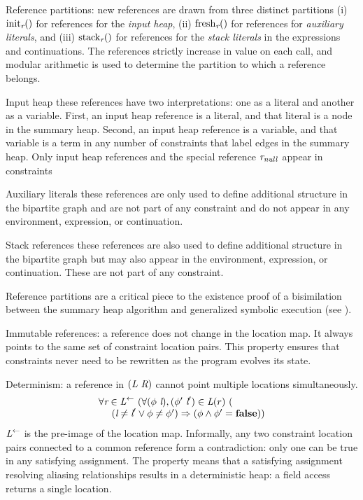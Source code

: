 Reference partitions: new references are drawn from
  three distinct partitions (i) $\mathrm{init}_{\emph{r}}()$ for references for the \emph{input heap}, (ii) $\mathrm{fresh}_{\emph{r}}()$ for references for \emph{auxiliary literals}, and
  (iii) $\mathrm{stack}_{\emph{r}}()$ for references for the \emph{stack literals} in the expressions and
  continuations. The references strictly increase in value on each
  call, and modular arithmetic is used to determine the partition to
  which a reference belongs.
\begin{compactdesc}
\item[Input heap] these references have two
  interpretations: one as a literal and another as a variable. First,
  an input heap reference is a literal, and that literal is a node in
  the summary heap. Second, an input heap reference is a variable, and
  that variable is a term in any number of constraints that label
  edges in the summary heap. Only input heap references and the
  special reference $\emph{r}_\mathit{null}$ appear in constraints
\item[Auxiliary literals] these references are only used to define additional structure in
  the bipartite graph and are not part of any constraint and do not appear
  in any environment, expression, or continuation.
\item[Stack references] these references are also used to define additional structure in the bipartite graph but may also appear in the environment, expression, or continuation. These are not part of any constraint.
\end{compactdesc}
Reference partitions are a critical piece to the existence proof of a
bisimilation between the summary heap algorithm and generalized
symbolic execution (see ).

Immutable references: a reference does not change in the
location map. It always points to the same set of constraint location
pairs. This property ensures that constraints never need to be
rewritten as the program evolves its state.

Determinism: a reference in  $(\cfgnt{L}\ \cfgnt{R})$ cannot point multiple locations simultaneously.
$$
\begin{array}{l}
\forall \cfgnt{r} \in \cfgnt{L}^\leftarrow\ (\forall (\phi\ \cfgnt{l}),(\phi^\prime\ \cfgnt{l}^\prime) \in \cfgnt{L}(r)\ (\\
\ \ \ \ (\cfgnt{l} \neq \cfgnt{l}^\prime \vee \phi \neq \phi^\prime) \Rightarrow (\phi \wedge \phi^\prime = \cfgt{false}))
\end{array}
$$
$\emph{L}^\leftarrow$ is the pre-image of the location
map. Informally, any two constraint location pairs connected to a
common reference form a contradiction: only one can be true in any
satisfying assignment. The property means that a satisfying assignment
resolving aliasing relationships results in a deterministic heap: a
field access returns a single location.

